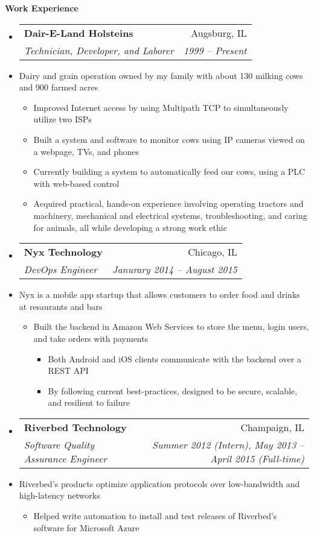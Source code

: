 \documentclass[letterpaper,11pt]{article}
\makeatletter
\newcommand{\resitem}[1]{\item #1 \vspace{-2pt}}
\newcommand{\resheading}[1]{{\large \colorbox{mygrey}{\begin{minipage}{\textwidth}{\textbf{#1 \vphantom{p\^{E}}}}\end{minipage}}}}
\newcommand{\ressubheading}[4]{
\begin{tabular*}{18.5cm}{l@{\extracolsep{\fill}}r}
		\textbf{#1} & #2 \\
		\textit{#3} & \textit{#4} \\
\end{tabular*}\vspace{-6pt}}
\makeatother
\begin{document}
\vspace{0.1in}

\resheading{Work Experience}
\begin{itemize}
\item
	\ressubheading{Dair-E-Land Holsteins}{Augsburg, IL}{Technician, Developer, and Laborer}{1999 -- Present}
	\item[]{Dairy and grain operation owned by my family with about 130 milking cows and 900 farmed acres}\vspace{-6pt}
	\begin{itemize}
		\resitem{Improved Internet access by using Multipath TCP to simultaneously utilize two ISPs}
		\resitem{Built a system and software to monitor cows using IP cameras viewed on a webpage, TVs, and phones}
		\resitem{Currently building a system to automatically feed our cows, using a PLC with web-based control}
		\resitem{Acquired practical, hands-on experience involving operating tractors and machinery, mechanical and electrical systems, troubleshooting, and caring for animals, all while developing a strong work ethic}
	\end{itemize}
\item
	\ressubheading{Nyx Technology}{Chicago, IL}{DevOps Engineer}{Janurary 2014 -- August 2015}
	\item[]{Nyx is a mobile app startup that allows customers to order food and drinks at resaurants and  bars}\vspace{-6pt}
	\begin{itemize}
		\resitem{Built the backend in Amazon Web Services to store the menu, login users, and take orders with payments}
			\begin{itemize}
				\resitem{Both Android and iOS clients communicate with the backend over a REST API}
				\resitem{By following current best-practices, designed to be secure, scalable, and resilient to failure}
			\end{itemize}
	\end{itemize}
\item
	\ressubheading{Riverbed Technology}{Champaign, IL}{Software Quality Assurance Engineer}{Summer 2012 (Intern),  May 2013 -- April 2015 (Full-time)}
	\item[]{Riverbed's products optimize application protocols over low-bandwidth and high-latency networks}\vspace{-6pt}
	\begin{itemize}
		\resitem{Helped write automation to install and test releases of Riverbed's software for Microsoft Azure}

\end{itemize}
\end{itemize}
\end{document}
